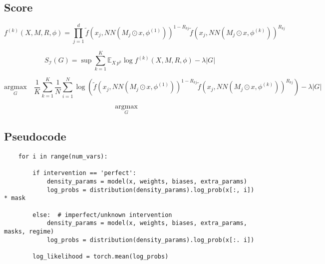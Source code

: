 \documentclass{article}
\begin{document}
\subsection{Score}

    

\begin{equation}
    f^{(k)}(X, M, R, \phi) = \prod_{j=1}^{d} \tilde{f}(x_j, NN(M_j \odot x, \phi^{(1)}))^{1-R_{kj}} \tilde{f}(x_j, NN(M_j \odot x, \phi^{(k)}))^{R_{kj}}
\end{equation}

\begin{equation}
    S_{\mathcal{I}}(G) = \sup \sum_{k=1}^K \mathbb{E}_{X ~ p^{k}} \log f^{(k)}(X, M, R, \phi) - \lambda |G|
\end{equation}

\begin{equation}
    \underset{G}{\mathrm{argmax}} \quad \frac{1}{K} \sum_{k=1}^K \frac{1}{N} \sum_{i=1}^N \log(\tilde{f}(x_j, NN(M_j \odot x, \phi^{(1)}))^{1-R_{kj}} \tilde{f}(x_j, NN(M_j \odot x, \phi^{(k)}))^{R_{kj}}) - \lambda |G|
\end{equation}

\begin{equation}
    \underset{G}{\mathrm{argmax}} \quad
\end{equation}


\subsection{Pseudocode}
\begin{verbatim}
    for i in range(num_vars):
        
        if intervention == 'perfect':
            density_params = model(x, weights, biases, extra_params)
            log_probs = distribution(density_params).log_prob(x[:, i]) * mask

        else:  # imperfect/unknown intervention
            density_params = model(x, weights, biases, extra_params, masks, regime)
            log_probs = distribution(density_params).log_prob(x[:. i])
        
        log_likelihood = torch.mean(log_probs)

\end{verbatim}
\end{document}
